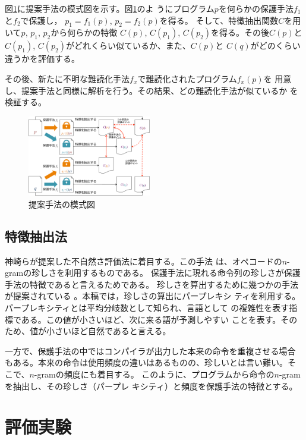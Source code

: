 \documentclass[a4j,fleqn,10pt]{jarticle}
\newcommand{\birth}[1]{$C(#1)$}
\begin{document}
図\ref{fig:overview}に提案手法の模式図を示す。図\ref{fig:overview}のよ
うにプログラム$p$を何らかの保護手法$f_1$と$f_2$で保護し，
$p_1=f_1(p)$, $p_2=f_2(p)$を得る。
%
そして、特徴抽出関数$C$を用いて$p$, $p_1$, $p_2$から何らかの特徴
\birth{p}, \birth{p_1}, \birth{p_2}を得る。その後\birth{p}と
\birth{p_1}, \birth{p_2}がどれくらい似ているか、また、\birth{p}と
\birth{q}がどのくらい違うかを評価する。

その後、新たに不明な難読化手法$f_x$で難読化されたプログラム$f_x(p)$を
用意し、提案手法と同様に解析を行う。その結果、どの難読化手法が似ているか
を検証する。

\begin{figure}[b]
  \includegraphics[width=0.48\textwidth]{overview}
  \caption{提案手法の模式図}\label{fig:overview}
\end{figure}

\subsection{特徴抽出法}\label{sect:method}

神崎らが提案した不自然さ評価法に着目する\cite{kanzaki14ipsj}。この手法
は、オペコードの$n$-gramの珍しさを利用するものである。
%
保護手法に現れる命令列の珍しさが保護手法の特徴であると言えるためである。
珍しさを算出するために幾つかの手法が提案されている
\cite{kanzaki14ipsj,gekka14scis}。本稿では，珍しさの算出にパープレキシ
ティを利用する。パープレキシティとは平均分岐数として知られ、言語として
の複雑性を表す指標である。この値が小さいほど、次に来る語が予測しやすい
ことを表す。そのため、値が小さいほど自然であると言える。

一方で、保護手法の中ではコンパイラが出力した本来の命令を重複させる場合
もある。本来の命令は使用頻度の違いはあるものの、珍しいとは言い難い。そ
こで、$n$-gramの頻度にも着目する。
%
このように、プログラムから命令の$n$-gramを抽出し、その珍しさ（パープレ
  キシティ）と頻度を保護手法の特徴とする。

\section{評価実験}\label{sect:experiments}
\end{document}
